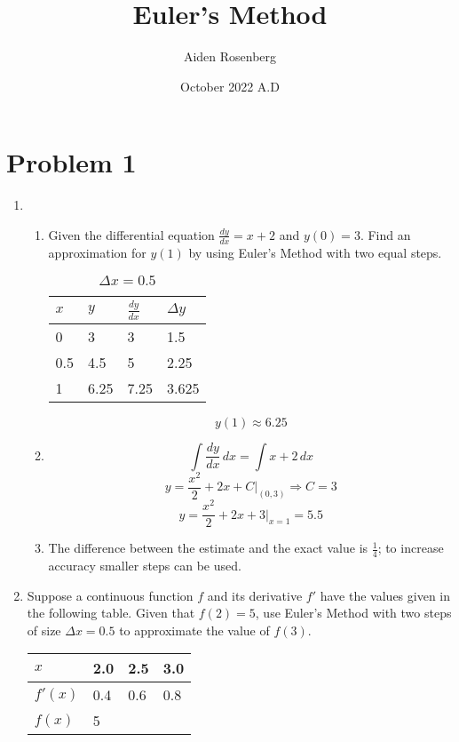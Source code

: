 \documentclass[12pt]{article}
\title{Euler's Method}
\author{Aiden Rosenberg}
\date{October 2022 A.D}
\begin{document}
\maketitle
\section*{Problem 1}
\begin{enumerate}
    \item 
    \begin{enumerate}
        \item Given the differential equation $\frac{dy}{dx}=x+2$ and $y(0)=3$. Find an approximation for $y(1)$ by using Euler's Method with two equal steps. 
 \begin{center}
            
\begin{table}[h]
\caption{$\Delta x = 0.5$}
\centering \label{table_example}
\begin{tabular}{l|l|l|l}
$x$ & $y$ & $\frac{dy}{dx}$ & $\Delta y $ \\ \hline
0 & 3 & 3 & 1.5 \\
0.5 & 4.5 & 5 & 2.25 \\
1 & 6.25 & 7.25 & 3.625
\end{tabular}
\end{table}
\end{center}
$$y(1) \approx 6.25$$

\item 
$$\int \frac{dy}{dx} \, dx =\int x+2 \, dx$$
$$y=\frac{x^2}{2}+2x+C \bigg\rvert_{(0,3)} \Longrightarrow C=3$$
$$ y=\frac{x^2}{2}+2x+3 \bigg\rvert_{x=1} = 5.5 $$

\item 
The difference between the estimate and the exact value is $\frac{1}{4}$; to increase accuracy smaller steps can be used.
\end{enumerate}

\item Suppose a continuous function $f$ and its derivative $f'$ have the values given in the following table. Given that $f(2)=5$, use Euler's Method with two steps of size $\Delta x =0.5$ to approximate the value of $f(3)$.

\begin{table}[h]
\centering
\begin{tabular}{l|l|l|l}
$x$ & 2.0 & 2.5 & 3.0 \\ \hline
$f'(x)$ & 0.4 & 0.6 & 0.8 \\ \hline
$f(x)$ & 5 &  & 
\end{tabular}
\end{table}


\end{enumerate}
\end{document}
